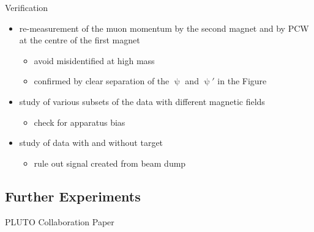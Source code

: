 \begin{frame}{Verification}

	\begin{itemize}\itemfill
		\item re-measurement of the muon momentum by the second magnet and by PCW at the centre of the first magnet
		\begin{itemize}
			\item avoid misidentified \ch{\ensuremath{\uppsi}->\ensuremath{\upmu^+}+\ensuremath{\upmu^-}} at high mass
			\item confirmed by clear separation of the $\uppsi$ and $\uppsi'$ in the Figure
		\end{itemize}
		\item study of various subsets of the data with different magnetic fields
		\begin{itemize}
			\item check for apparatus bias
		\end{itemize}
	\end{itemize}
	
	\begin{minipage}{0.58\textwidth}
		\begin{itemize}
			\item study of data with and without target
			\begin{itemize}
				\item rule out signal created from beam dump
			\end{itemize}
		\end{itemize}
	\end{minipage}
	\begin{minipage}{.4\textwidth}
	\end{minipage}\vspace*{-20pt}

	
\end{frame}

\subsection{Further Experiments}
\begin{frame}{PLUTO Collaboration Paper}

	
\end{frame}

